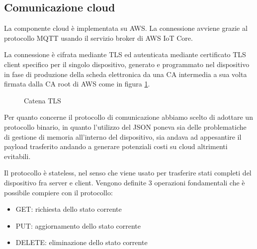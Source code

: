 \documentclass{article}
\begin{document}
\subsection{Comunicazione cloud}

La componente cloud è implementata su AWS. La connessione avviene grazie al protocollo
MQTT usando il servizio broker di AWS IoT Core.

La connessione è cifrata mediante TLS ed autenticata mediante certificato TLS client
specifico per il singolo dispositivo, generato e programmato nel dispositivo in fase
di produzione della scheda elettronica da una CA intermedia a sua volta firmata dalla
CA root di AWS come in figura \ref{tls-chain}.

\begin{figure}[ht]
    \centering
    \caption{Catena TLS}
    \label{tls-chain}
\end{figure}

Per quanto concerne il protocollo di comunicazione abbiamo scelto di adottare un
protocollo binario, in quanto l'utilizzo del JSON poneva sia delle problematiche
di gestione di memoria all'interno del dispositivo, sia andava ad appesantire il
payload trasferito andando a generare potenziali costi su cloud altrimenti evitabili.

Il protocollo è stateless, nel senso che viene usato per trasferire stati completi
del dispositivo fra server e client. Vengono definite 3 operazioni fondamentali
che è possibile compiere con il protocollo:

\begin{itemize}
    \item GET: richiesta dello stato corrente
    \item PUT: aggiornamento dello stato corrente
    \item DELETE: eliminazione dello stato corrente
\end{itemize}
\end{document}
